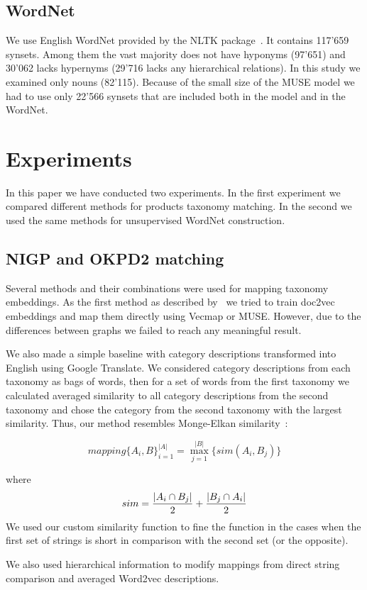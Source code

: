 \documentclass[11pt,a4paper]{article}
\begin{document}
\subsection{WordNet}
We use English WordNet provided by the NLTK package~\cite{wordnet,nltk}. It contains 117'659 synsets. Among them the vast majority does not have hyponyms (97'651) and 30'062 lacks hypernyms (29'716 lacks any hierarchical relations). In this study we examined only nouns (82'115). Because of the small size of the MUSE model we had to use only 22'566 synsets that are included both in the model and in the WordNet.
\section{Experiments}
In this paper we have conducted two experiments. In the first experiment we compared different methods for products taxonomy matching. In the second we used the same methods for unsupervised WordNet construction.
\subsection{NIGP and OKPD2 matching}
Several methods and their combinations were used for mapping taxonomy embeddings. As the first method as described by~\cite{gordeev-fruct}  we tried to train doc2vec embeddings and map them directly using Vecmap or MUSE. However, due to the differences between graphs we failed to reach any meaningful result.

We also made a simple baseline with category descriptions transformed into English using Google Translate. We considered category descriptions from each taxonomy as bags of words, then for a set of words from the first taxonomy we calculated averaged similarity to all category descriptions from the second taxonomy and chose the category from the second taxonomy with the largest similarity. Thus, our method resembles Monge-Elkan similarity~\cite[p.~111]{dupe-detect}:


$$mapping\{A_i, B\}_{i=1}^{|A|} = \max_{j=1}^{|B|}\{sim(A_i,B_j)\}$$

where $$sim = \dfrac{|A_i \cap B_j|}{2} + \\ \dfrac{|B_j \cap A_i|}{2} $$
We used our custom similarity function to fine the function in the cases when the first set of strings is short in comparison with the second set (or the opposite).

We also used hierarchical information to modify mappings from direct string comparison and averaged Word2vec descriptions.
\end{document}
